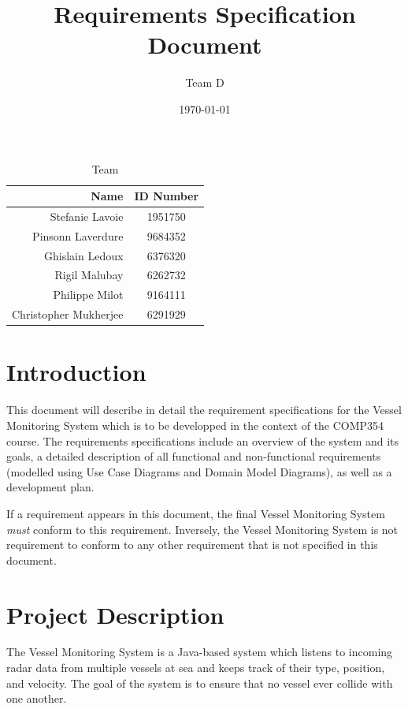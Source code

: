 \documentclass{article}
\begin{document}
\title{Requirements Specification Document}
\author{Team D}
\date{\today}

\maketitle

\vspace*{1.5in}
\begin{table}[htbp]
\caption{Team}
\begin{center}
\begin{tabular}{|r | c|}
\hline
Name & ID Number \\
\hline\hline
Stefanie Lavoie & 1951750 \\
Pinsonn Laverdure & 9684352 \\
Ghislain Ledoux & 6376320 \\
Rigil Malubay & 6262732 \\
Philippe Milot & 9164111 \\
Christopher Mukherjee & 6291929 \\
\hline
\end{tabular}
\end{center}
\end{table}

\clearpage

\section{Introduction} %

This document will describe in detail the requirement specifications for the Vessel Monitoring System which is to be developped in the context of the COMP354 course. The requirements specifications include an overview of the system and its goals, a detailed description of all functional and non-functional requirements (modelled using Use Case Diagrams and Domain Model Diagrams), as well as a development plan. 

If a requirement appears in this document, the final Vessel Monitoring System \emph{must} conform to this requirement. Inversely, the Vessel Monitoring System is not requirement to conform to any other requirement that is not specified in this document.

\section{Project Description} %

The Vessel Monitoring System is a Java-based system which listens to incoming radar data from multiple vessels at sea and keeps track of their type, position, and velocity. The goal of the system is to ensure that no vessel ever collide with one another.
\end{document}
